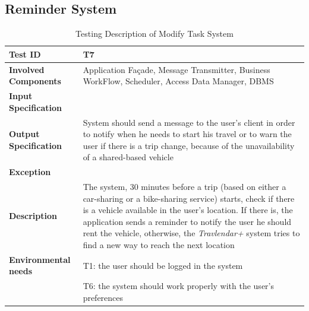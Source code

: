 \subsection*{Reminder System}

\begin{table}[H]
    \centering
    \begin{tabular}{p{4.55cm} p{7cm}}
        
        \hline
        
        \textbf{Test ID}                & T7 \\
        
        \hline
        
        \textbf{Involved Components}    & Application Façade, Message Transmitter, Business                                                            WorkFlow, Scheduler, Access Data Manager, DBMS\\
        
        \hline
        
        \textbf{Input Specification}    & \\
        
        \hline
        
        \textbf{Output Specification}   & System should send a message to the user's client in order to notify when he needs to start his travel or to warn the user if there is a trip change, because of the unavailability of a shared-based vehicle\\
        
        \hline
        
        \textbf{Exception}              & \\
        
        \hline
        
        \textbf{Description}            & The system, 30 minutes before a trip (based on either a car-sharing or a bike-sharing service) starts, check if there is a vehicle available in the user's location. If there is, the application sends a reminder to notify the user he should rent the vehicle, otherwise, the \emph{Travlendar+} system tries to find a new way to reach the next location\\
        \hline
        
        \textbf{Environmental needs}    & T1: the user should be logged in the system\\
                                        & T6: the system should work properly with the user's preferences \\
        
        \hline
        
    \end{tabular}
    \caption{Testing Description of Modify Task System}
    
\end{table}




